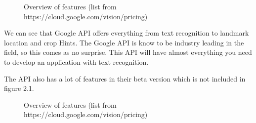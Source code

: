 \begin{figure}[h]
    \caption{Overview of features (list from https://cloud.google.com/vision/pricing)}
    \label{fig:Features}
\end{figure}

We can see that Google API offers everything from text recognition to landmark location and crop Hints.
The Google API is know to be industry leading in the field, so this comes as no surprise.
This API will have almost everything you need to develop an application with text recognition.

The API also has a lot of features in their beta version which is not included in figure 2.1.
\clearpage


\begin{figure}[h]
    \caption{Overview of features (list from https://cloud.google.com/vision/pricing)}
    \label{fig:Prices}
\end{figure}


